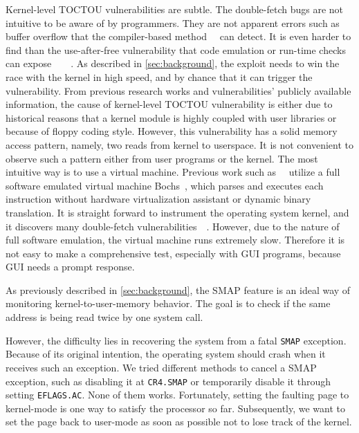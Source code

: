 Kernel-level TOCTOU vulnerabilities are subtle. The double-fetch bugs are not intuitive to be aware of by programmers. They are not apparent errors such as buffer overflow that the compiler-based method~\cite{nagarakatte2015everything}~\cite{zhang2010intpatch} can detect. It is even harder to find than the use-after-free vulnerability that code emulation or run-time checks can expose~\cite{feist2016finding}~\cite{chen2020savior}~\cite{lee2015preventing}~\cite{serebryany2012addresssanitizer}. As described in \autoref{sec:background}, the exploit needs to win the race with the kernel in high speed, and by chance that it can trigger the vulnerability. From previous research works and vulnerabilities' publicly available information, the cause of kernel-level TOCTOU vulnerability is either due to historical reasons that a kernel module is highly coupled with user libraries or because of floppy coding style. However, this vulnerability has a solid memory access pattern, namely, two reads from kernel to userspace. It is not convenient to observe such a pattern either from user programs or the kernel. The most intuitive way is to use a virtual machine. Previous work such as~\cite{jurczyk2013identifying}~\cite{bochspwnreloaded} utilize a full software emulated virtual machine Bochs~\cite{lawton2003bochs}, which parses and executes each instruction without hardware virtualization assistant or dynamic binary translation.  It is straight forward to instrument the operating system kernel, and it discovers many double-fetch vulnerabilities~\cite{jurczyk2013identifying}~\cite{bochspwnreloaded}. However, due to the nature of full software emulation, the virtual machine runs extremely slow. Therefore it is not easy to make a comprehensive test, especially with GUI programs, because GUI needs a prompt response.

As previously described in \autoref{sec:background}, the SMAP feature is an ideal way of monitoring kernel-to-user-memory behavior. The goal is to check if the same address is being read twice by one system call. 

However, the difficulty lies in recovering the system from a fatal \texttt{SMAP} exception.  Because of its original intention, the operating system should crash when it receives such an exception. We tried different methods to cancel a SMAP exception, such as disabling it at \texttt{CR4.SMAP} or temporarily disable it through setting \texttt{EFLAGS.AC}. None of them works.  Fortunately, setting the faulting page to kernel-mode is one way to satisfy the processor so far. Subsequently, we want to set the page back to user-mode as soon as possible not to lose track of the kernel.

